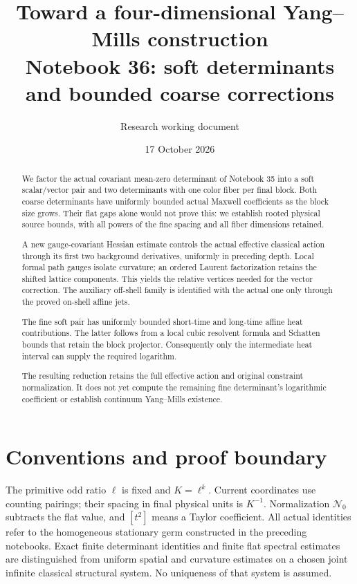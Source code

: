 \documentclass[11pt]{article}
\title{Toward a four-dimensional Yang--Mills construction\\
\large Notebook 36: soft determinants and bounded coarse corrections}
\author{Research working document}
\date{17 October 2026}
\theoremstyle{remark}
\begin{document}
\maketitle
\begin{abstract}
We factor the actual covariant mean-zero determinant of Notebook 35
into a soft scalar/vector pair and two determinants with one color
fiber per final block. Both coarse determinants have uniformly bounded
actual Maxwell coefficients as the block size grows. Their flat gaps
alone would not prove this: we establish rooted physical source bounds,
with all powers of the fine spacing and all fiber dimensions retained.

A new gauge-covariant Hessian estimate controls the actual effective
classical action through its first two background derivatives, uniformly
in preceding depth. Local formal path gauges isolate curvature; an
ordered Laurent factorization retains the shifted lattice components.
This yields the relative vertices needed for the vector correction.
The auxiliary off-shell family is identified with the actual one only
through the proved on-shell affine jets.

The fine soft pair has uniformly bounded short-time and long-time
affine heat contributions. The latter follows from a local cubic
resolvent formula and Schatten bounds that retain the block projector.
Consequently only the intermediate heat interval can supply the
required logarithm.

The resulting reduction retains the full effective action and original
constraint normalization. It does not yet compute the remaining fine
determinant's logarithmic coefficient or establish continuum
Yang--Mills existence.
\end{abstract}

\section*{Conventions and proof boundary}

The primitive odd ratio \(\ell\) is fixed and \(K=\ell^k\).
Current coordinates use counting pairings; their spacing in final
physical units is \(K^{-1}\). Normalization \(\mathcal N_0\) subtracts
the flat value, and \([t^2]\) means a Taylor coefficient.
All actual identities refer to the homogeneous stationary germ
constructed in the preceding notebooks. Exact finite determinant
identities and finite flat spectral estimates are distinguished from
uniform spatial and curvature estimates on a chosen joint infinite
classical structural system. No uniqueness of that system is assumed.
\end{document}
